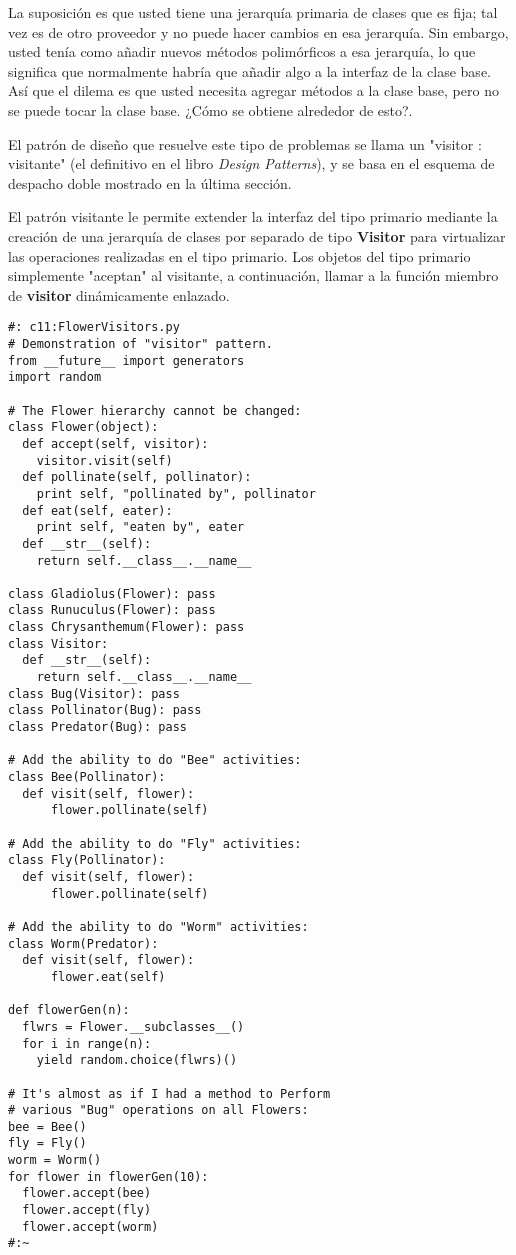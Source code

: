 La suposición es que usted tiene una jerarquía primaria de clases que es fija; tal vez es de otro proveedor y no puede hacer cambios en esa jerarquía. Sin embargo, usted tenía como añadir nuevos métodos polimórficos a esa jerarquía, lo que significa que normalmente habría que añadir algo a la interfaz de la clase base. Así que el dilema es que usted necesita agregar métodos a la clase base, pero no se puede tocar la clase base. ¿Cómo se obtiene alrededor de esto?.     \newline

El patrón de diseño que resuelve este tipo de problemas se llama un "visitor : visitante" (el definitivo en el libro \textit{Design Patterns}), y se basa en el esquema de despacho doble mostrado en la última sección.    \newline

El patrón visitante le permite extender la interfaz del tipo primario mediante la creación de una jerarquía de clases por separado de tipo \textbf{Visitor} para virtualizar las operaciones realizadas en el tipo primario. Los objetos del tipo primario simplemente "aceptan" al visitante, a continuación, llamar a la función miembro de \textbf{visitor} dinámicamente enlazado.   \newline

\begin{lstlisting} 
#: c11:FlowerVisitors.py 
# Demonstration of "visitor" pattern. 
from __future__ import generators 
import random 

# The Flower hierarchy cannot be changed: 
class Flower(object):   
  def accept(self, visitor): 
    visitor.visit(self) 
  def pollinate(self, pollinator): 
    print self, "pollinated by", pollinator 
  def eat(self, eater): 
    print self, "eaten by", eater 
  def __str__(self):  
    return self.__class__.__name__
    
class Gladiolus(Flower): pass 
class Runuculus(Flower): pass 
class Chrysanthemum(Flower): pass  
class Visitor: 
  def __str__(self):  
    return self.__class__.__name__ 
class Bug(Visitor): pass 
class Pollinator(Bug): pass 
class Predator(Bug): pass 

# Add the ability to do "Bee" activities: 
class Bee(Pollinator): 
  def visit(self, flower): 
      flower.pollinate(self) 
      
# Add the ability to do "Fly" activities: 
class Fly(Pollinator): 
  def visit(self, flower): 
      flower.pollinate(self) 
      
# Add the ability to do "Worm" activities: 
class Worm(Predator): 
  def visit(self, flower): 
      flower.eat(self) 
      
def flowerGen(n): 
  flwrs = Flower.__subclasses__() 
  for i in range(n): 
    yield random.choice(flwrs)() 
    
# It's almost as if I had a method to Perform 
# various "Bug" operations on all Flowers: 
bee = Bee() 
fly = Fly() 
worm = Worm() 
for flower in flowerGen(10): 
  flower.accept(bee) 
  flower.accept(fly) 
  flower.accept(worm) 
#:~ 
\end{lstlisting}




